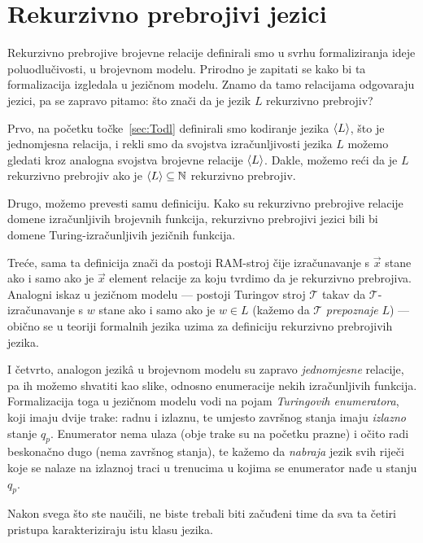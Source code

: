 \section{Rekurzivno prebrojivi jezici}\label{sec:relang}

Rekurzivno prebrojive brojevne relacije definirali smo u svrhu formaliziranja ideje poluodlučivosti, u brojevnom modelu. Prirodno je zapitati se kako bi ta formalizacija izgledala u jezičnom modelu. Znamo da tamo relacijama odgovaraju jezici, pa se zapravo pitamo: što znači da je jezik $L$ rekurzivno prebrojiv?

Prvo, na početku točke~\ref{sec:Todl} definirali smo kodiranje jezika $\langle L\rangle$, što je jednomjesna relacija, i rekli smo da svojstva izračunljivosti jezika $L$ možemo gledati kroz analogna svojstva brojevne relacije $\langle L\rangle$. Dakle, možemo reći da je $L$ rekurzivno prebrojiv ako je $\langle L\rangle\subseteq{\mathbb N}$ rekurzivno prebrojiv.

Drugo, možemo prevesti samu definiciju. Kako su rekurzivno prebrojive relacije domene izračunljivih brojevnih funkcija, rekurzivno prebrojivi jezici bili bi domene Turing-izračunljivih jezičnih funkcija.

Treće, sama ta definicija znači da postoji RAM-stroj čije izračunavanje s $\vec x$ stane ako i samo ako je $\vec x$ element relacije za koju tvrdimo da je rekurzivno prebrojiva. Analogni iskaz u jezičnom modelu --- postoji Turingov stroj $\mathcal T$ takav da $\mathcal T$-izračunavanje s $w$ stane ako i samo ako je $w\in L$ (kažemo da $\mathcal T$ \emph{prepoznaje} $L$) --- obično se u teoriji formalnih jezika uzima za definiciju rekurzivno prebrojivih jezika.

I četvrto, analogon jezik\^a u brojevnom modelu su zapravo \emph{jednomjesne} relacije, pa ih možemo shvatiti kao slike, odnosno enumeracije nekih izračunljivih funkcija. Formalizacija toga u jezičnom modelu vodi na pojam \emph{Turingovih enumeratora}, koji imaju dvije trake: radnu i izlaznu, te umjesto završnog stanja imaju \emph{izlazno} stanje $q_p$. Enumerator nema ulaza (obje trake su na početku prazne) i očito radi beskonačno dugo (nema završnog stanja), te kažemo da \emph{nabraja} jezik svih riječi koje se nalaze na izlaznoj traci u trenucima u kojima se enumerator nađe u stanju $q_p$.

Nakon svega što ste naučili, ne biste trebali biti začuđeni time da sva ta četiri pristupa karakteriziraju istu klasu jezika.

